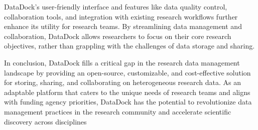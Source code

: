 \documentclass[conference]{IEEEtran}
\begin{document}
DataDock's user-friendly interface and features like data quality control, collaboration tools, and integration with existing research workflows further enhance its utility for research teams. By streamlining data management and collaboration, DataDock allows researchers to focus on their core research objectives, rather than grappling with the challenges of data storage and sharing.

In conclusion, DataDock fills a critical gap in the research data management landscape by providing an open-source, customizable, and cost-effective solution for storing, sharing, and collaborating on heterogeneous research data. As an adaptable platform that caters to the unique needs of research teams and aligns with funding agency priorities, DataDock has the potential to revolutionize data management practices in the research community and accelerate scientific discovery across disciplines



\end{document}
